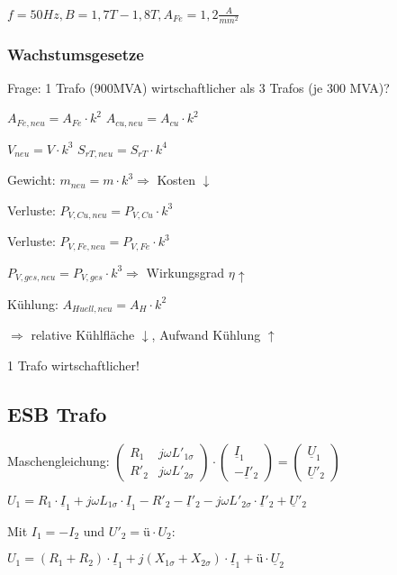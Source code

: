 \documentclass[a4paper,11pt]{article}
\begin{document}
	$f = 50Hz, B = 1,7 T - 1,8 T, A_{Fe} = 1,2 \frac{A}{mm^{2}}$

	\subsubsection{Wachstumsgesetze}

	Frage: 1 Trafo (900MVA) wirtschaftlicher als 3 Trafos (je 300 MVA)?

	$A_{Fe,neu} = A_{Fe} \cdot k^2$ \quad $A_{cu,neu} = A_{cu} \cdot k^2$ \quad

	$V_{neu} = V \cdot k^3$ \quad $S_{rT,neu} = S_{rT} \cdot k^4$

	Gewicht: $m_{neu} = m \cdot k^3 \Rightarrow$ Kosten $\downarrow$ 

	Verluste: $P_{V,Cu,neu} = P_{V,Cu} \cdot k^3$

	Verluste: $P_{V,Fe,neu} = P_{V,Fe} \cdot k^3$

	$P_{V,ges,neu} = P_{V,ges} \cdot k^3 \Rightarrow$ Wirkungsgrad $\eta \uparrow$

	Kühlung: $A_{Huell,neu} = A_H \cdot k^2$ 

	$\Rightarrow$ relative Kühlfläche $\downarrow$, Aufwand Kühlung $\uparrow$

	1 Trafo wirtschaftlicher!

	\subsection{ESB Trafo}

	Maschengleichung:
	$
	\begin{pmatrix}
		R_{1} & j\omega L'_{1\sigma} \\
		R'_{2} & j\omega L'_{2\sigma}
	\end{pmatrix} \cdot
	\begin{pmatrix}
		\underline{I}_{1} \\
		-\underline{I}'_{2}
	\end{pmatrix} =
	\begin{pmatrix}
		\underline{U}_{1} \\
		\underline{U}'_{2}
	\end{pmatrix}
	$

	$U_{1} = R_{1} \cdot \underline{I}_{1} + j\omega L_{1\sigma} \cdot \underline{I}_{1} - R'_{2}- \underline{I}'_{2}-j\omega L'_{2\sigma} \cdot \underline{I}'_{2}+ \underline{U}'_{2}$

	Mit $I_{1} = -I_{2}$ und $U'_{2} = \text{ü} \cdot U_2$:

	$U_{1} = (R_1 + R_2) \cdot \underline{I}_1 + j(X_{1\sigma} + X_{2\sigma}) \cdot \underline{I}_1 + \text{ü} \cdot \underline{U}_2$
\end{document}
